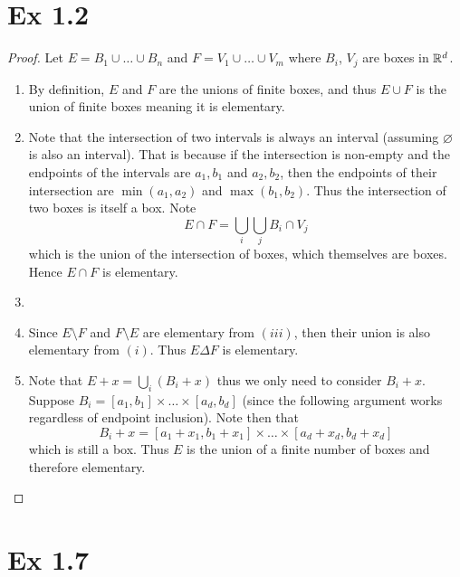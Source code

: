 \documentclass[hw_all.tex]{subfiles}
\begin{document}
\section*{Ex 1.2}

\begin{proof}
    Let $E = B_1 \cup \ldots \cup B_n$ and $F = V_1 \cup \ldots \cup V_m$ where $B_i$, $V_j$ are boxes in $\mathbb{R}^{d}$.
    \begin{enumerate}[label=(\roman*)]
        \item By definition, $E$ and $F$ are the unions of finite boxes, and thus $E \cup F$ is the union of finite boxes meaning it is elementary.

        \item Note that the intersection of two intervals is always an interval (assuming $\varnothing$ is also an interval). That is because if the intersection is non-empty and the endpoints of the intervals are $a_1, b_1$ and $a_2, b_2$, then the endpoints of their intersection are $\min(a_1, a_2)$ and $\max(b_1, b_2)$. Thus the intersection of two boxes is itself a box. Note
            \[
                E \cap F = \bigcup_{i} \bigcup_{j} B_i \cap V_j
            \]
            which is the union of the intersection of boxes, which themselves are boxes. Hence $E \cap F$ is elementary.

        \item 
        \item Since $E \setminus F$ and $F \setminus E$ are elementary from $(iii)$, then their union is also elementary from $(i)$. Thus $E \Delta F$ is elementary.
        \item Note that $E + x = \bigcup_{i} (B_i + x)$ thus we only need to consider $B_i + x$. Suppose $B_i = [a_1,b_1] \times \ldots \times [a_d, b_d]$ (since the following argument works regardless of endpoint inclusion). Note then that
            \[
                B_i + x = [a_1 + x_1, b_1 + x_1] \times \ldots \times [a_d + x_d, b_d + x_d]
            \]
            which is still a box. Thus $E$ is the union of a finite number of boxes and therefore elementary.
    \end{enumerate}
\end{proof}

\section*{Ex 1.7}
\end{document}
